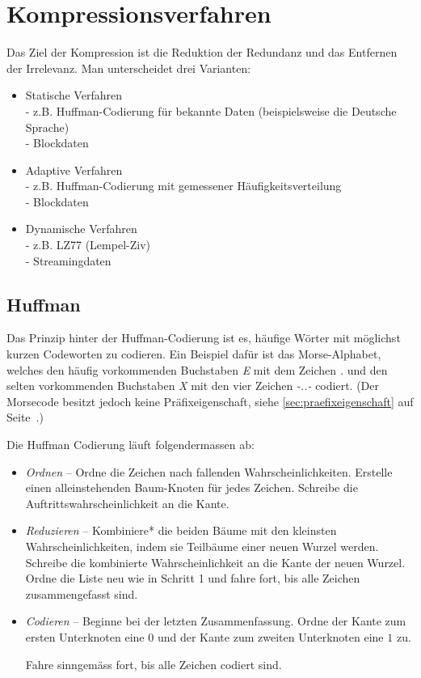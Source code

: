 \section{Kompressionsverfahren}

Das Ziel der Kompression ist die Reduktion der Redundanz und das Entfernen der
Irrelevanz. Man unterscheidet drei Varianten:

\begin{itemize}
	\item Statische Verfahren\\
		- z.B. Huffman-Codierung für bekannte Daten (beispielsweise die Deutsche
		Sprache)\\
		- Blockdaten
	\item Adaptive Verfahren\\
		- z.B. Huffman-Codierung mit gemessener Häufigkeitsverteilung\\
		- Blockdaten
	\item Dynamische Verfahren\\
		- z.B. LZ77 (Lempel-Ziv)\\
		- Streamingdaten
\end{itemize}


\subsection{Huffman}

Das Prinzip hinter der Huffman-Codierung ist es, häufige Wörter mit möglichst
kurzen Codeworten zu codieren. Ein Beispiel dafür ist das Morse-Alphabet,
welches den häufig vorkommenden Buchstaben \textit{E} mit dem Zeichen \textit{.}
und den selten vorkommenden Buchstaben \textit{X} mit den vier Zeichen
\textit{-..-} codiert. (Der Morsecode besitzt jedoch keine Präfixeigenschaft,
siehe \autoref{sec:praefixeigenschaft} auf
Seite~\pageref{sec:praefixeigenschaft}.)

Die Huffman Codierung läuft folgendermassen ab:

\begin{itemize}
	\item \textit{Ordnen} -- Ordne die Zeichen nach fallenden
		Wahrscheinlichkeiten. Erstelle einen alleinstehenden Baum-Knoten für jedes
		Zeichen. Schreibe die Auftrittswahrscheinlichkeit an die Kante.
	\item \textit{Reduzieren} -- Kombiniere* die beiden Bäume mit den kleinsten
		Wahrscheinlichkeiten, indem sie Teilbäume einer neuen Wurzel werden.
		Schreibe die kombinierte Wahrscheinlichkeit an die Kante der neuen Wurzel.
		Ordne die Liste neu wie in Schritt 1 und fahre fort, bis alle Zeichen
		zusammengefasst sind.
	\item \textit{Codieren} -- Beginne bei der letzten Zusammenfassung. Ordne der
		Kante zum ersten Unterknoten eine $0$ und der Kante zum zweiten Unterknoten
		eine $1$ zu.

		Fahre sinngemäss fort, bis alle Zeichen codiert sind.
\end{itemize}

